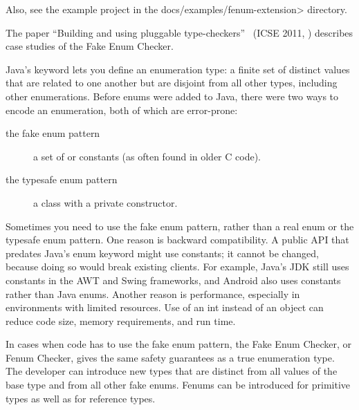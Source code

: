 Also, see the example project in the \<docs/examples/fenum-extension> directory.

The paper ``Building and using pluggable
type-checkers''~\cite{DietlDEMS2011} (ICSE 2011,
)
describes case studies of the Fake Enum Checker.



Java's
\href{https://docs.oracle.com/javase/specs/jls/se25/html/jls-8.html#jls-8.9}{}
keyword lets you define an enumeration type: a finite set of distinct values
that are related to one another but are disjoint from all other
types, including other enumerations.
Before enums were added to Java, there were two ways to encode an
enumeration, both of which are error-prone:

\begin{description}
\item[the fake enum pattern]  a set of  or 
  constants (as often found in older C code).

\item[the typesafe enum pattern]  a class with a private constructor.
\end{description}

Sometimes you need to use the fake enum pattern,
rather than a real enum or the typesafe enum pattern.
%
One reason is backward compatibility.  A public API that predates Java's
enum keyword might use  constants; it cannot be changed, because
doing so would break existing clients.  For example, Java's JDK still uses
 constants in the AWT and Swing frameworks, and Android also uses
 constants rather than Java enums.
%
Another reason is performance, especially in environments with limited
resources.  Use of an int instead of an object can
reduce code size, memory requirements, and run time.

In cases when code has to use the fake enum pattern, the Fake Enum Checker,
or Fenum Checker, gives the same safety guarantees as a true enumeration type.
The developer can introduce new types that are distinct from all values of the
base type and from all other fake enums. Fenums can be introduced for
primitive types as well as for reference types.


